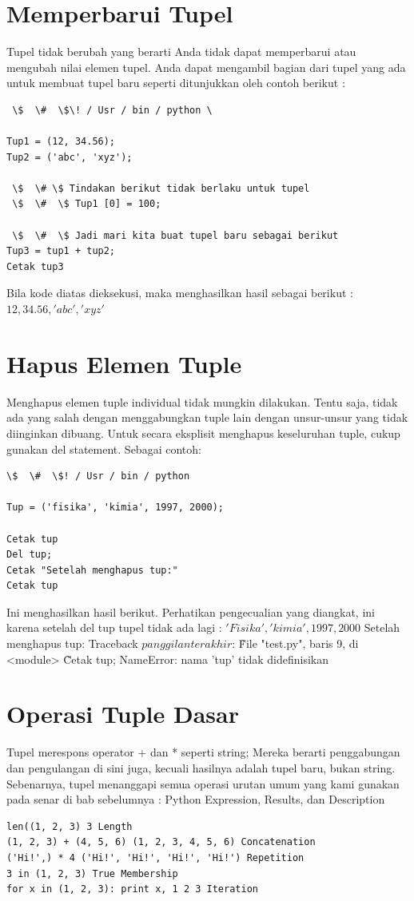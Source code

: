 \section{Memperbarui Tupel} 
Tupel tidak berubah yang berarti Anda tidak dapat memperbarui atau mengubah nilai elemen tupel. Anda dapat mengambil bagian dari tupel yang ada untuk membuat tupel baru seperti ditunjukkan oleh contoh berikut :
 \begin{verbatim}
 \$  \#  \$\! / Usr / bin / python \

Tup1 = (12, 34.56);
Tup2 = ('abc', 'xyz'); 

 \$  \# \$ Tindakan berikut tidak berlaku untuk tupel 
 \$  \#  \$ Tup1 [0] = 100; 

 \$  \#  \$ Jadi mari kita buat tupel baru sebagai berikut 
Tup3 = tup1 + tup2; 
Cetak tup3 
\end{verbatim}
Bila kode diatas dieksekusi, maka menghasilkan hasil sebagai berikut : 
\(12, 34.56, 'abc', 'xyz'\) 
\section{Hapus Elemen Tuple} 
Menghapus elemen tuple individual tidak mungkin dilakukan. Tentu saja, tidak ada yang salah dengan menggabungkan tuple lain dengan unsur-unsur yang tidak diinginkan dibuang. 
Untuk secara eksplisit menghapus keseluruhan tuple, cukup gunakan del statement. Sebagai contoh: 
\begin{verbatim}
\$  \#  \$! / Usr / bin / python 

Tup = ('fisika', 'kimia', 1997, 2000);

Cetak tup 
Del tup; 
Cetak "Setelah menghapus tup:" 
Cetak tup 
\end{verbatim}
Ini menghasilkan hasil berikut. Perhatikan pengecualian yang diangkat, ini karena setelah del tup tupel tidak ada lagi :
\('Fisika', 'kimia', 1997, 2000\) 
Setelah menghapus tup: 
Traceback \(panggilan terakhir\): 
\~ File "test.py", baris 9, di <module> 
\~ Cetak tup; 
NameError: nama 'tup' tidak didefinisikan 
\section{Operasi Tuple Dasar}
Tupel merespons operator + dan * seperti string; Mereka berarti penggabungan dan pengulangan di sini juga, kecuali hasilnya adalah tupel baru, bukan string. 
Sebenarnya, tupel menanggapi semua operasi urutan umum yang kami gunakan pada senar di bab sebelumnya : 
Python Expression, Results, dan Description 
\begin{verbatim}
len((1, 2, 3) 3 Length 
(1, 2, 3) + (4, 5, 6) (1, 2, 3, 4, 5, 6) Concatenation 
('Hi!',) * 4 ('Hi!', 'Hi!', 'Hi!', 'Hi!') Repetition 
3 in (1, 2, 3) True Membership 
for x in (1, 2, 3): print x, 1 2 3 Iteration 
\end{verbatim}
